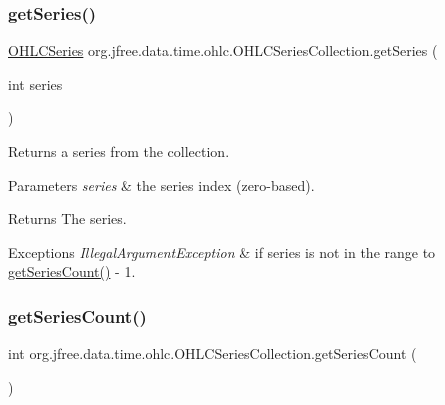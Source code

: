 \subsubsection{\texorpdfstring{get\+Series()}{getSeries()}}
{\footnotesize\ttfamily \mbox{\hyperlink{classorg_1_1jfree_1_1data_1_1time_1_1ohlc_1_1_o_h_l_c_series}{O\+H\+L\+C\+Series}} org.\+jfree.\+data.\+time.\+ohlc.\+O\+H\+L\+C\+Series\+Collection.\+get\+Series (\begin{DoxyParamCaption}\item[{int}]{series }\end{DoxyParamCaption})}

Returns a series from the collection.


\begin{DoxyParams}{Parameters}
{\em series} & the series index (zero-\/based).\\
\hline
\end{DoxyParams}
\begin{DoxyReturn}{Returns}
The series.
\end{DoxyReturn}

\begin{DoxyExceptions}{Exceptions}
{\em Illegal\+Argument\+Exception} & if {\ttfamily series} is not in the range {} to {\ttfamily \mbox{\hyperlink{classorg_1_1jfree_1_1data_1_1time_1_1ohlc_1_1_o_h_l_c_series_collection_aa6b3cf5922a008e3c39d01282a008a6e}{get\+Series\+Count()}} -\/ 1}. \\
\hline
\end{DoxyExceptions}
\mbox{\label{classorg_1_1jfree_1_1data_1_1time_1_1ohlc_1_1_o_h_l_c_series_collection_aa6b3cf5922a008e3c39d01282a008a6e}} 
\subsubsection{\texorpdfstring{get\+Series\+Count()}{getSeriesCount()}}
{\footnotesize\ttfamily int org.\+jfree.\+data.\+time.\+ohlc.\+O\+H\+L\+C\+Series\+Collection.\+get\+Series\+Count (\begin{DoxyParamCaption}{ }\end{DoxyParamCaption})}

